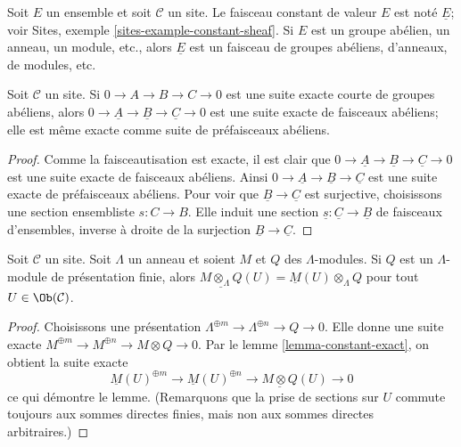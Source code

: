 \noindent
Soit $E$ un ensemble et soit $\mathcal{C}$ un site. Le faisceau constant de
valeur $E$ est noté $\underline{E}$; voir Sites,
exemple \ref{sites-example-constant-sheaf}. Si $E$ est un groupe abélien, un
anneau, un module, etc., alors $\underline{E}$ est un faisceau de groupes
abéliens, d'anneaux, de modules, etc.

\begin{lemma}
\label{lemma-constant-exact}
Soit $\mathcal{C}$ un site. Si $0 \to A \to B \to C \to 0$ est une suite
exacte courte de groupes abéliens, alors
$0 \to \underline{A} \to \underline{B} \to \underline{C} \to 0$
est une suite exacte de faisceaux abéliens; elle est même exacte comme suite
de préfaisceaux abéliens.
\end{lemma}

\begin{proof}
Comme la faisceautisation est exacte, il est clair que
$0 \to \underline{A} \to \underline{B} \to \underline{C} \to 0$
est une suite exacte de faisceaux abéliens. Ainsi
$0 \to \underline{A} \to \underline{B} \to \underline{C}$
est une suite exacte de préfaisceaux abéliens. Pour voir que
$\underline{B} \to \underline{C}$ est surjective, choisissons une section
ensembliste $s : C \to B$. Elle induit une section
$\underline{s} : \underline{C} \to \underline{B}$ de faisceaux d'ensembles,
inverse à droite de la surjection $\underline{B} \to \underline{C}$.
\end{proof}

\begin{lemma}
\label{lemma-tensor-with-finitely-presented}
Soit $\mathcal{C}$ un site. Soit $\Lambda$ un anneau et soient $M$ et $Q$ des
$\Lambda$-modules. Si $Q$ est un $\Lambda$-module de présentation finie, alors
$\underline{M \otimes_\Lambda Q}(U) = \underline{M}(U) \otimes_\Lambda Q$
pour tout $U \in \Ob(\mathcal{C})$.
\end{lemma}

\begin{proof}
Choisissons une présentation
$\Lambda^{\oplus m} \to \Lambda^{\oplus n} \to Q \to 0$. Elle donne une
suite exacte $M^{\oplus m} \to M^{\oplus n} \to M \otimes Q \to 0$.
Par le lemme \ref{lemma-constant-exact}, on obtient la suite exacte
$$
\underline{M}(U)^{\oplus m} \to
\underline{M}(U)^{\oplus n} \to
\underline{M \otimes Q}(U) \to 0
$$
ce qui démontre le lemme. (Remarquons que la prise de sections sur $U$ commute
toujours aux sommes directes finies, mais non aux sommes directes arbitraires.)
\end{proof}

